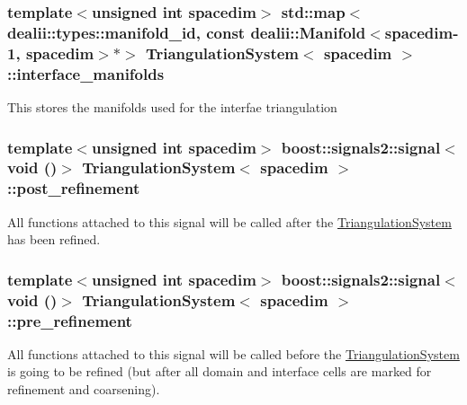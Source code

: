 \subsubsection[{\texorpdfstring{interface\+\_\+manifolds}{interface_manifolds}}]{\setlength{\rightskip}{0pt plus 5cm}template$<$unsigned int spacedim$>$ std\+::map$<${\bf dealii\+::types\+::manifold\+\_\+id}, const dealii\+::\+Manifold$<$spacedim-\/1, spacedim$>$$\ast$$>$ {\bf Triangulation\+System}$<$ spacedim $>$\+::interface\+\_\+manifolds\hspace{0.3cm}{\ttfamily [private]}}\hypertarget{class_triangulation_system_a130322b74b66f27d8611ce92ad241c6d}{}\label{class_triangulation_system_a130322b74b66f27d8611ce92ad241c6d}
This stores the manifolds used for the interfae triangulation 
\subsubsection[{\texorpdfstring{post\+\_\+refinement}{post_refinement}}]{\setlength{\rightskip}{0pt plus 5cm}template$<$unsigned int spacedim$>$ boost\+::signals2\+::signal$<$void ()$>$ {\bf Triangulation\+System}$<$ spacedim $>$\+::post\+\_\+refinement\hspace{0.3cm}{\ttfamily [mutable]}}\hypertarget{class_triangulation_system_a8813b73cab76c8b77c47c00c39233f76}{}\label{class_triangulation_system_a8813b73cab76c8b77c47c00c39233f76}
All functions attached to this signal will be called after the \hyperlink{class_triangulation_system}{Triangulation\+System} has been refined. 
\subsubsection[{\texorpdfstring{pre\+\_\+refinement}{pre_refinement}}]{\setlength{\rightskip}{0pt plus 5cm}template$<$unsigned int spacedim$>$ boost\+::signals2\+::signal$<$void ()$>$ {\bf Triangulation\+System}$<$ spacedim $>$\+::pre\+\_\+refinement\hspace{0.3cm}{\ttfamily [mutable]}}\hypertarget{class_triangulation_system_ad3b16b86e7cbe4800fb5a40114cbc5fb}{}\label{class_triangulation_system_ad3b16b86e7cbe4800fb5a40114cbc5fb}
All functions attached to this signal will be called before the \hyperlink{class_triangulation_system}{Triangulation\+System} is going to be refined (but after all domain and interface cells are marked for refinement and coarsening). 
